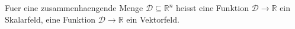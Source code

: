 Fuer eine zusammenhaengende Menge $\mathcal{D} \subseteq \mathbb{R}^n$ heisst eine Funktion $\mathcal{D} \to \mathbb{R}$ ein Skalarfeld, eine Funktion $\mathcal{D} \to \mathbb{R}$ ein Vektorfeld.
